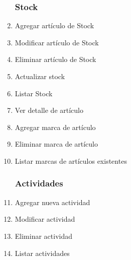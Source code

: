 \documentclass[12pt]{extarticle}
\begin{document}
\begin{spacing}{1.2}
\begin{multicols}{2}
\begin{enumerate}
        \subsubsection*{Stock}
            \item Agregar artículo de Stock
            \item Modificar artículo de Stock
            \item Eliminar artículo de Stock
            \item Actualizar stock
            \item Listar Stock
            \item Ver detalle de artículo
            \item Agregar marca de artículo
            \item Eliminar marca de artículo
            \item Listar marcas de artículos existentes
        \subsubsection*{Actividades}
            \item Agregar nueva actividad
            \item Modificar actividad
            \item Eliminar actividad
            \item Listar actividades

\end{enumerate}
\end{multicols}
\end{spacing}
\end{document}
